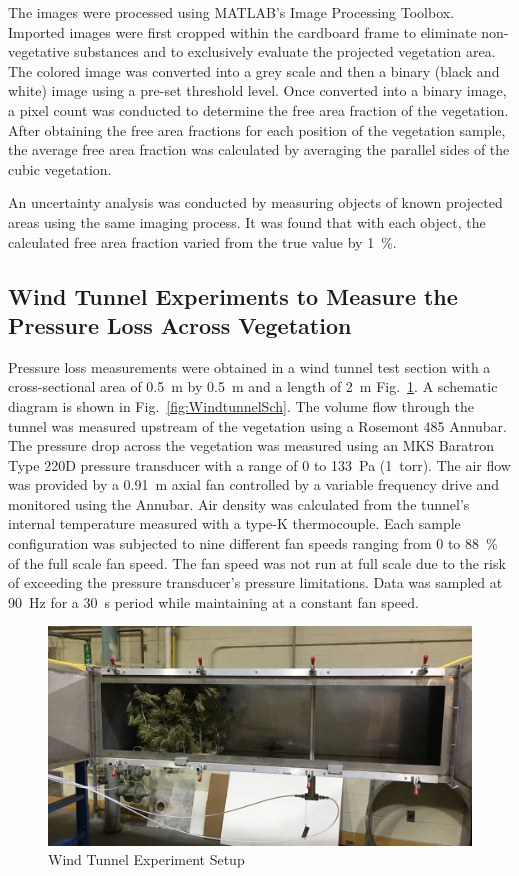\documentclass[12pt]{article}
\begin{document}
The images were processed using MATLAB's Image Processing Toolbox. Imported images were first cropped within the cardboard frame to eliminate non-vegetative substances and to exclusively evaluate the projected vegetation area. The colored image was converted into a grey scale and then a binary (black and white) image using a pre-set threshold level. Once converted into a binary image, a pixel count was conducted to determine the free area fraction of the vegetation. After obtaining the free area fractions for each position of the vegetation sample, the average free area fraction was calculated by averaging the parallel sides of the cubic vegetation.
 
An uncertainty analysis was conducted by measuring objects of known projected areas using the same imaging process. It was found that with each object, the calculated free area fraction varied from the true value by 1~\%.

\subsection{Wind Tunnel Experiments to Measure the Pressure Loss Across Vegetation}
\label{ssec:headingscap}

Pressure loss measurements were obtained in a wind tunnel test section with a cross-sectional area of 0.5~\si{m} by 0.5~\si{m} and a length of 2~\si{m} Fig.~\ref{fig:WindtunnelPic}. A schematic diagram is shown in Fig.~\ref{fig:WindtunnelSch}. The volume flow through the tunnel was measured upstream of the vegetation using a Rosemont 485 Annubar. The pressure drop across the vegetation was measured using an MKS Baratron Type 220D pressure transducer with a range of 0 to 133~Pa (1~torr). The air flow was provided by a 0.91~m axial fan controlled by a variable frequency drive and monitored using the Annubar. Air density was calculated from the tunnel's internal temperature measured with a type-K thermocouple. Each sample configuration was subjected to nine different fan speeds ranging from 0 to 88~\% of the full scale fan speed. The fan speed was not run at full scale due to the risk of exceeding the pressure transducer's pressure limitations. Data was sampled at 90~\si{Hz} for a 30~\si{s} period while maintaining at a constant fan speed.

\begin{figure} [!ht]
	\centering 	\includegraphics[width=1.0\linewidth]{Picture4.jpg}
	\caption{Wind Tunnel Experiment Setup}
	\label{fig:WindtunnelPic}
\end{figure}
\end{document}
